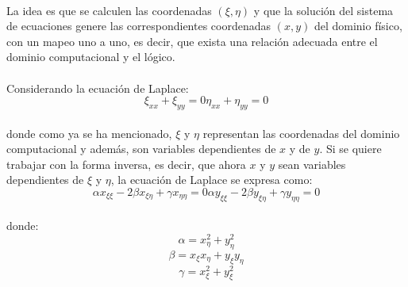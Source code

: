 \documentclass[letterpaper, openright, 12pt]{book}
\begin{document}
    \paragraph*{}
    La idea es que se calculen las coordenadas $(\xi, \eta)$ y que la
    solución del sistema de ecuaciones genere las correspondientes
    coordenadas $(x, y)$ del dominio físico, con un mapeo uno a uno, es
    decir, que exista una relación adecuada entre el dominio computacional y
    el lógico.

    \paragraph*{}
    Considerando la ecuación de Laplace:
    \begin{subequations}
        \begin{equation}
            \xi_{xx} + \xi_{yy} = 0
        \end{equation}
        \begin{equation}
            \eta_{xx} + \eta_{yy} = 0
        \end{equation}
        \label{ec-laplace}
    \end{subequations}\\
    donde como ya se ha mencionado, $\xi$ y $\eta$ representan las
    coordenadas del dominio computacional y además, son variables
    dependientes de $x$ y de $y$. Si se quiere trabajar con la forma
    inversa, es decir, que ahora $x$ y $y$ sean variables dependientes de
    $\xi$ y $\eta$, la ecuación  de Laplace se expresa como:
    \begin{subequations}
        \begin{equation}
            \alpha x_{\xi \xi} - 2\beta x_{\xi \eta} + \gamma x_{\eta \eta} = 0
        \end{equation}
        \begin{equation}
            \alpha y_{\xi \xi} - 2\beta y_{\xi \eta} + \gamma y_{\eta \eta} = 0
        \end{equation}
        \label{ec-laplace-invertida}
    \end{subequations}\\

    donde:
    \begin{equation*}
        \alpha = x_{\eta} ^ 2 + y_{\eta}^2
    \end{equation*}
    \begin{equation*}
        \beta = x_{\xi} x_{\eta} + y_{\xi} y_{\eta}
    \end{equation*}
    \begin{equation*}
        \gamma = x_{\xi} ^ 2 + y_{\xi} ^ 2
    \end{equation*}
\end{document}
